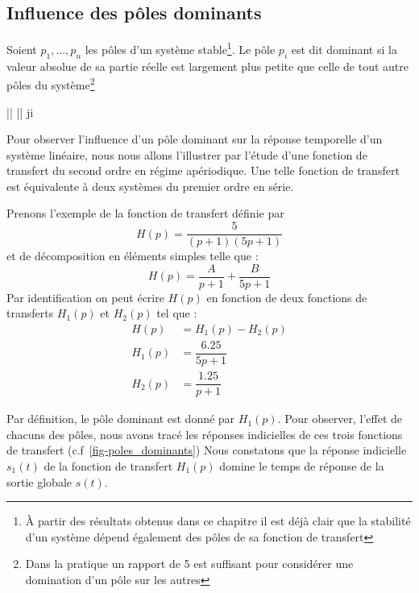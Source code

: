 \subsection{Influence des pôles dominants}

Soient $p_1,\ldots,p_n$ les pôles d'un système stable\footnote{À partir 
des résultats obtenus dans ce chapitre il est déjà clair que la stabilité
d'un système dépend également des pôles de sa fonction de transfert}.
Le pôle $p_i$ est dit dominant si la valeur absolue
de sa partie réelle est largement plus petite que celle de tout autre pôles 
du système\footnote{Dans la pratique un rapport de 5 est 
suffisant pour considérer une domination d'un pôle sur les autres}
\begin{bequation}
    \big|\big| \ll \big|\big|\;\; \forall j\neq i
\end{bequation}

Pour observer l'influence d'un pôle dominant sur 
la réponse temporelle d'un système linéaire, nous
nous allons l'illustrer par l'étude d'une fonction 
de transfert du second ordre en régime apériodique.
Une telle fonction de transfert est équivalente à deux
systèmes du premier ordre en série.

Prenons l'exemple de la fonction de transfert définie par  
\begin{equation}
H(p)=\dfrac{5}{(p+1)(5p+1)}\label{eq-ft-chap6}
\end{equation}
et de décomposition en éléments simples telle que :
$$
H(p)=\dfrac{A}{p+1}+\dfrac{B}{5p+1}
$$
Par identification on peut écrire $H(p)$ en fonction de
deux fonctions de transferts $H_1(p)$ et $H_2(p)$ tel que :
\begin{align*}
	H(p)&=H_1(p)-H_2(p)\\
	H_1(p)&=\dfrac{6.25}{5p+1}\\
	H_2(p)&=\dfrac{1.25}{p+1}
\end{align*}

Par définition, le pôle dominant est donné par $H_1(p)$.
Pour observer, l'effet de chacuns des pôles, nous avons tracé 
les réponses indicielles de ces trois fonctions de transfert
(c.f~\cref{fig-poles_dominants})
Nous constatons que la réponse indicielle $s_1(t)$ de la fonction
de transfert $H_1(p)$ domine le temps de réponse de la sortie
globale $s(t)$.

